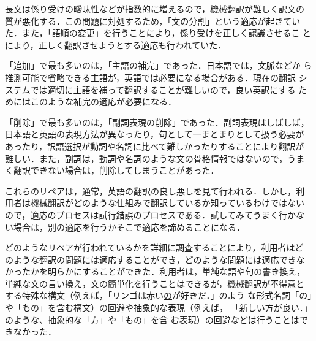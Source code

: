 長文は係り受けの曖昧性などが指数的に増えるので，機械翻訳が難しく訳文の
質が悪化する．この問題に対処するため，「文の分割」という適応が起きてい
た．また，「語順の変更」を行うことにより，係り受けを正しく認識させるこ
とにより，正しく翻訳させようとする適応も行われていた．

「追加」で最も多いのは，「主語の補完」であった．日本語では，文脈などか
ら推測可能で省略できる主語が，英語では必要になる場合がある．現在の翻訳
システムでは適切に主語を補って翻訳することが難しいので，良い英訳にする
ためにはこのような補完の適応が必要になる．

「削除」で最も多いのは，「副詞表現の削除」であった．副詞表現はしばしば，
日本語と英語の表現方法が異なったり，句として一まとまりとして扱う必要が
あったり，訳語選択が動詞や名詞に比べて難しかったりすることにより翻訳が
難しい．また，副詞は，動詞や名詞のような文の骨格情報ではないので，うま
く翻訳できない場合は，削除してしまうことがあった．

これらのリペアは，通常，英語の翻訳の良し悪しを見て行われる．しかし，利
用者は機械翻訳がどのような仕組みで翻訳しているか知っているわけではない
ので，適応のプロセスは試行錯誤のプロセスである．試してみてうまく行かな
い場合は，別の適応を行うかそこで適応を諦めることになる．

どのようなリペアが行われているかを詳細に調査することにより，利用者はど
のような翻訳の問題には適応することができ，どのような問題には適応できな
かったかを明らかにすることができた．利用者は，単純な語や句の書き換え，
単純な文の言い換え，文の簡単化を行うことはできるが，機械翻訳が不得意と
する特殊な構文（例えば，「リンゴは赤い\underline{の}が好きだ．」のよう
な形式名詞「の」や「もの」を含む構文）の回避や抽象的な表現（例えば，
「新しい\underline{方}が良い．」のような、抽象的な「方」や「もの」を含
む表現）の回避などは行うことはできなかった．


